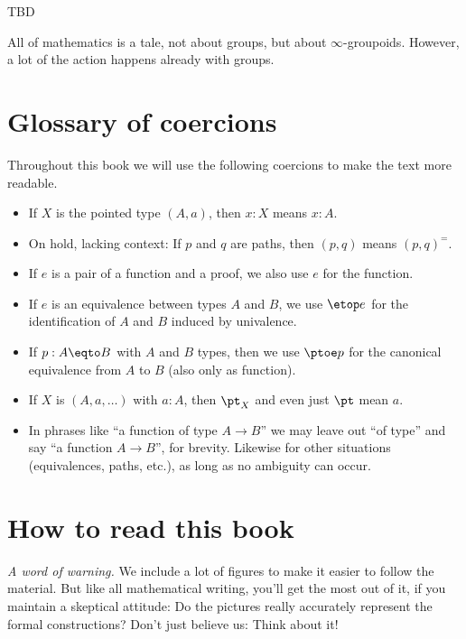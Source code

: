 %

TBD

All of mathematics is a tale, not about groups,
but about $\infty$-groupoids.
However, a lot of the action happens already with groups.

\section*{Glossary of coercions}

Throughout this book we will use the following coercions to make the text more readable.
\begin{itemize}[noitemsep]
\item If $X$ is the pointed type $(A,a)$, then $x:X$ means $x:A$.
\item On hold, lacking context: If $p$ and $q$ are paths, then $(p,q)$ means $(p,q)^=$.
\item If $e$ is a pair of a function and a proof, we also use $e$ for the function.
\item If $e$ is an equivalence between types $A$ and $B$, we use $\etop e$ for the
identification of $A$ and $B$ induced by univalence.
\item If $p: A\eqto B$ with $A$ and $B$ types, then we use $\ptoe p$ for the canonical
equivalence from $A$ to $B$ (also only as function).
\item If $X$ is $(A,a,\ldots)$ with $a:A$, then $\pt_X$ and even just $\pt$ mean $a$.
\item In phrases like ``a function of type $A\to B$'' we may leave out ``of type'' and
say ``a function $A\to B$'', for brevity. 
Likewise for other situations (equivalences, paths, etc.), as long as no ambiguity can occur.
\end{itemize}

 
\section*{How to read this book}

\noindent\emph{A word of warning.}\enspace
We include a lot of figures to make it easier to follow the material.
But like all mathematical writing, you'll get the most out of it,
if you maintain a skeptical attitude:
Do the pictures really accurately represent the formal constructions?
Don't just believe us: Think about it!

